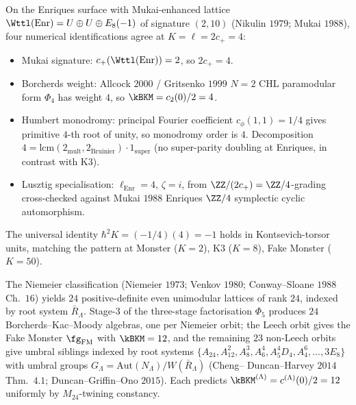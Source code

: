 \begin{theorem}
\label{wn:thm:wave3-enriques-witness}\ClaimStatusTheorem
On the Enriques surface with Mukai-enhanced lattice
$\Wttl(\mathrm{Enr}) = U \oplus U \oplus E_8(-1)$ of signature
$(2, 10)$ (Nikulin $1979$; Mukai $1988$), four numerical
identifications agree at $K = \ell = 2c_+ = 4$:
\begin{itemize}
\item Mukai signature: $c_+(\Wttl(\mathrm{Enr})) = 2$, so
$2c_+ = 4$.
\item Borcherds weight: Allcock $2000$ / Gritsenko $1999$ $N = 2$
CHL paramodular form $\Phi_4$ has weight $4$, so
$\kBKM = c_2(0)/2 = 4$.
\item Humbert monodromy: principal Fourier coefficient $c_\phi(1, 1)
= 1/4$ gives primitive $4$-th root of unity, so monodromy order is
$4$. Decomposition $4 = \mathrm{lcm}(2_{\mathrm{mult}},
2_{\mathrm{Bruinier}}) \cdot 1_{\mathrm{super}}$ (no super-parity
doubling at Enriques, in contrast with K3).
\item Lusztig specialisation: $\ell_{\mathrm{Enr}} = 4$,
$\zeta = i$, from $\ZZ/(2c_+) = \ZZ/4$-grading cross-checked against
Mukai $1988$ Enriques $\ZZ/4$ symplectic cyclic automorphism.
\end{itemize}
The universal identity $\hbar^2 K = (-1/4)(4) = -1$ holds in
Kontsevich-torsor units, matching the pattern at Monster ($K = 2$),
K$3$ ($K = 8$), Fake Monster ($K = 50$).
\end{theorem}

\begin{theorem}[Twenty-three umbral-moonshine siblings at $d = 5$]
\label{wn:thm:wave3-umbral-23}\ClaimStatusTheorem
The Niemeier classification (Niemeier $1973$; Venkov $1980$;
Conway--Sloane $1988$ Ch.~$16$) yields $24$ positive-definite even
unimodular lattices of rank $24$, indexed by root system
$\bar{R}_\Lambda$. Stage-$3$ of the three-stage factorisation $\Phi_5$
produces $24$ Borcherds--Kac--Moody algebras, one per Niemeier orbit;
the Leech orbit gives the Fake Monster $\fg_{\mathrm{FM}}$ with
$\kBKM = 12$, and the remaining $23$ non-Leech orbits give umbral
siblings indexed by root systems $\{A_{24}, A_{12}^2, A_8^3, A_6^4,
A_5^4 D_4, A_4^6, \ldots, 3 E_8\}$ with umbral groups
$G_\Lambda = \mathrm{Aut}(N_\Lambda)/W(\bar{R}_\Lambda)$ (Cheng--
Duncan--Harvey $2014$ Thm.~$4.1$; Duncan--Griffin--Ono $2015$). Each
predicts $\kBKM^{(\Lambda)} = c^{(\Lambda)}(0)/2 = 12$ uniformly by
$M_{24}$-twining constancy.
\end{theorem}

